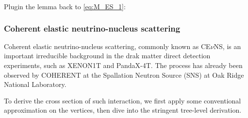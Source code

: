 Plugin the lemma back to \eqref{eq:M_ES_1}:



\subsubsection{Coherent elastic neutrino-nucleus scattering}

Coherent elastic neutrino-nucleus scattering, commonly known as CE$\nu$NS,
is an important irreducible background in the drak matter direct detection experiments,
such as XENON1T\cite{aprile_search_2021} and PandaX-4T\cite{ma_search_2023}.
The process has already been observed by COHERENT\cite{akimov_observation_2017} at the Spallation Neutron Source (SNS) at Oak Ridge National Laboratory.

To derive the cross section of such interaction,
we first apply some conventional approximation on the vertices, then dive into the stringent tree-level derivation.


